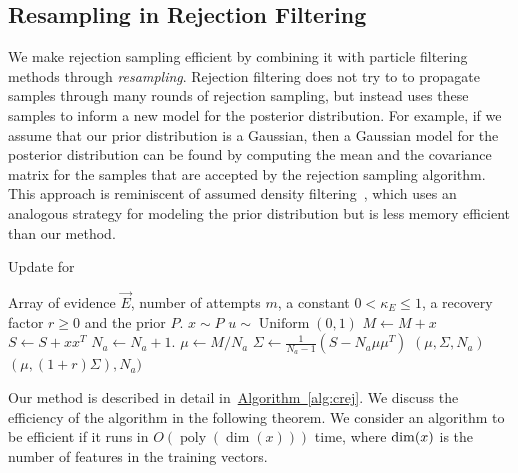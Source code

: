 \documentclass{article} %
\newcommand{\alg}[1]{\hyperref[alg:#1]{Algorithm~\ref*{alg:#1}}}
\newcommand{\CRej}{\text{rejection filtering}}
\begin{document}
\subsection{Resampling in Rejection Filtering}

We make rejection sampling efficient by combining it with particle
filtering methods through \emph{resampling}.
Rejection filtering does not try to
to propagate samples through many rounds of rejection sampling, but instead
uses these samples to inform a new model for the posterior distribution. 
For example, if
we assume that our prior distribution is a Gaussian, then a Gaussian model for the posterior
distribution can be found by computing the mean and the covariance matrix for the samples
that are accepted by the rejection sampling algorithm.  This approach is
reminiscent of assumed density filtering~\cite{minka_expectation_2001}, which uses an analogous strategy
for modeling the prior distribution but is less memory efficient than
our method.

\begin{algorithm}[t!]
    \caption{Update for \CRej}
    \label{alg:crej}
    \begin{algorithmic}
        \Require Array of evidence $\vec{E}$, number of attempts $m$, a constant $0<\kappa_E\le 1$, a recovery factor $r \ge 0$ and the prior $P$.
            \State $x \sim P$
            \State $u \sim \operatorname{Uniform}(0, 1)$
            \State $M \gets M+ x$
            \State $S \gets S+ xx^T$
    \State $N_a \gets N_a +1$.
            \EndIf
    \EndFor
       \State $\mu\gets M/N_a $
       \State $\Sigma \gets \frac{1}{N_a -1}\left(S - N_a \mu\mu^T \right)$
    \State\Return $(\mu,\Sigma,N_a)$
   \Else
    \State\Return $(\mu, (1+r)\Sigma),N_a)$

   \EndIf
          
        \EndFunction
    \end{algorithmic}
\end{algorithm}

Our method is described in detail in~\alg{crej}. We discuss the efficiency of the algorithm in the following theorem.
We consider an algorithm to be efficient if it runs in $O(\operatorname{poly}(\operatorname{dim}(x)))$ time, where ${\rm dim}(x)$ is the number of features in the training vectors.
\end{document}
